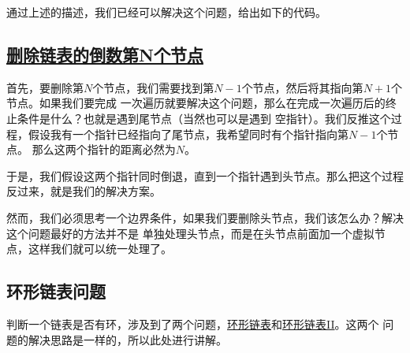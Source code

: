 \documentclass[../../main.tex]{subfiles}
\begin{document}
通过上述的描述，我们已经可以解决这个问题，给出如下的代码。



\subsection{\href{https://leetcode.cn/problems/remove-nth-node-from-end-of-list/}{删除链表的倒数第N个节点}}

首先，要删除第$N$个节点，我们需要找到第$N - 1$个节点，然后将其指向第$N + 1$个节点。如果我们要完成
一次遍历就要解决这个问题，那么在完成一次遍历后的终止条件是什么？也就是遇到尾节点（当然也可以是遇到
空指针）。我们反推这个过程，假设我有一个指针已经指向了尾节点，我希望同时有个指针指向第$N - 1$个节点。
那么这两个指针的距离必然为$N$。

于是，我们假设这两个指针同时倒退，直到一个指针遇到头节点。那么把这个过程反过来，就是我们的解决方案。

\begin{kaobox}[title=边界条件]
  然而，我们必须思考一个边界条件，如果我们要删除头节点，我们该怎么办？解决这个问题最好的方法并不是
  单独处理头节点，而是在头节点前面加一个虚拟节点，这样我们就可以统一处理了。
\end{kaobox}



\subsection{环形链表问题}

判断一个链表是否有环，涉及到了两个问题，\href{https://leetcode-cn.com/problems/linked-list-cycle/}
{环形链表}和\href{https://leetcode-cn.com/problems/linked-list-cycle-ii/}{环形链表II}。这两个
问题的解决思路是一样的，所以此处进行讲解。
\end{document}
